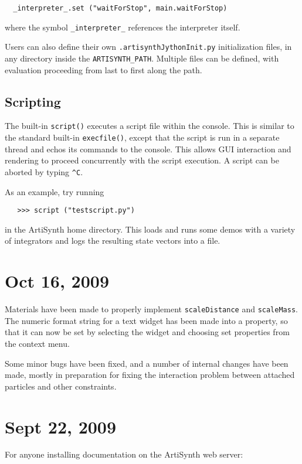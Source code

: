 \documentclass{article}
\begin{document}
\begin{verbatim}
  _interpreter_.set ("waitForStop", main.waitForStop)
\end{verbatim}

where the symbol {\tt \_interpreter\_} references the interpreter itself.

Users can also define their own {\tt .artisynthJythonInit.py}
initialization files, in any directory inside the
{\tt ARTISYNTH\_PATH}. Multiple files can be defined, with evaluation
proceeding from last to first along the path.

\subsection*{Scripting}

The built-in {\tt script()} executes a script file within the console. This
is similar to the standard built-in {\tt execfile()}, except that the script
is run in a separate thread and echos its commands to the
console. This allows
GUI interaction and rendering to proceed concurrently with the script
execution. A script can be aborted by typing {\tt \verb|^|C}.

As an example, try running 
\begin{verbatim}
   >>> script ("testscript.py")
\end{verbatim}
in the ArtiSynth home directory. This loads and runs some
demos with a variety of integrators and logs the resulting state
vectors into a file.

\section*{Oct 16, 2009}

Materials have been made to properly implement {\tt scaleDistance} and
{\tt scaleMass}. The numeric format string for a text widget has been made
into a property, so that it can now be set by selecting the widget and
choosing {\sf set properties} from the context menu.

Some minor bugs have been fixed, and a number of internal changes have
been made, mostly in preparation for fixing the interaction problem
between attached particles and other constraints.

\section*{Sept 22, 2009}

For anyone installing documentation on the ArtiSynth web server:
\end{document}
